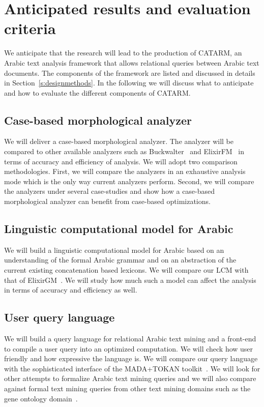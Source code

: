 \documentclass[12pt]{article}
\begin{document}
\section{Anticipated results and evaluation criteria}
\label{s:results}

We anticipate that the research will lead to the production of 
CATARM, an Arabic text analysis framework that allows relational 
queries between Arabic text documents.
The components of the framework are listed and discussed
in details in Section~\ref{s:designmethods}.
In the following we will discuss what to anticipate and 
how to evaluate the different components of CATARM. 

\subsection{Case-based morphological analyzer} 

We will deliver a case-based morphological analyzer. 
The analyzer will be compared to other available analyzers such as
Buckwalter~\cite{Tim04} and ElixirFM~\cite{Otakar:07} in terms
of accuracy and efficiency of analysis.
We will adopt two comparison methodologies. 
First, we will compare the analyzers in an exhaustive analysis mode
which is the only way current analyzers perform. 
Second, we will compare the analyzers under several case-studies
and show how a case-based morphological analyzer can benefit
from case-based optimizations.

\subsection{Linguistic computational model for Arabic}

We will build a linguistic computational model for Arabic 
based on an understanding of the formal Arabic grammar 
and on an abstraction of the current existing concatenation
based lexicons.
We will compare our LCM with that of ElixirGM~\cite{Otakar:07}.
We will study how much such a model can affect the analysis
in terms of accuracy and efficiency as well. 

\subsection{User query language}

We will build a query language for relational Arabic text mining 
and a front-end to compile a user query into an optimized
computation. 
We will check how user friendly and how expressive the language is.
We will compare our query language with the sophisticated 
interface of the MADA+TOKAN toolkit~\cite{Habash:09}.
We will look for other attempts to formalize Arabic text 
mining queries and we will also compare against 
formal text mining queries from other text mining domains such
as the gene ontology domain~\cite{GeneOntology10}.
\end{document}
